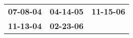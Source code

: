 \begin{supertabular}{p{0.33\columnwidth}p{0.33\columnwidth}p{0.33\columnwidth}}
 \textbf{07-08-04\textsuperscript{}} &  \textbf{04-14-05\textsuperscript{}} &  \textbf{11-15-06\textsuperscript{}} \\
 \textbf{11-13-04\textsuperscript{}} &  \textbf{02-23-06\textsuperscript{}} &                                      \\
\end{supertabular}
